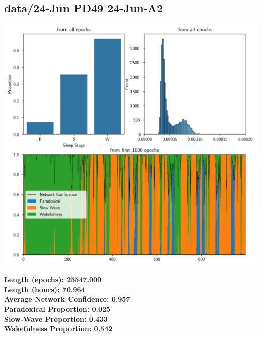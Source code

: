         \subsection*{ data/24-Jun PD49 24-Jun-A2 }
        \begin{center}
        \begin{adjustbox}{width=1\textwidth}
        \includegraphics[page=4]{figs.pdf}
        \end{adjustbox}
        \end{center}
        \large\textbf{Length (epochs): 25547.000}\\
        \textbf{Length (hours): 70.964}\\
        \textbf{Average Network Confidence: 0.957}\\
        \textbf{Paradoxical Proportion: 0.025}\\
        \textbf{Slow-Wave Proportion: 0.433}\\
        \textbf{Wakefulness Proportion: 0.542}\\
        
